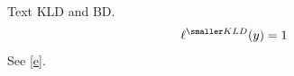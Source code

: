 \documentclass{article}
\begin{document}
\begin{acronym}
\end{acronym}
Text {\smaller KLD} and \ac{BD}.
\begin{equation}\ell^{\smaller KLD}(y)=1\label{e}\end{equation}
See \eqref{e}.
\end{document}
